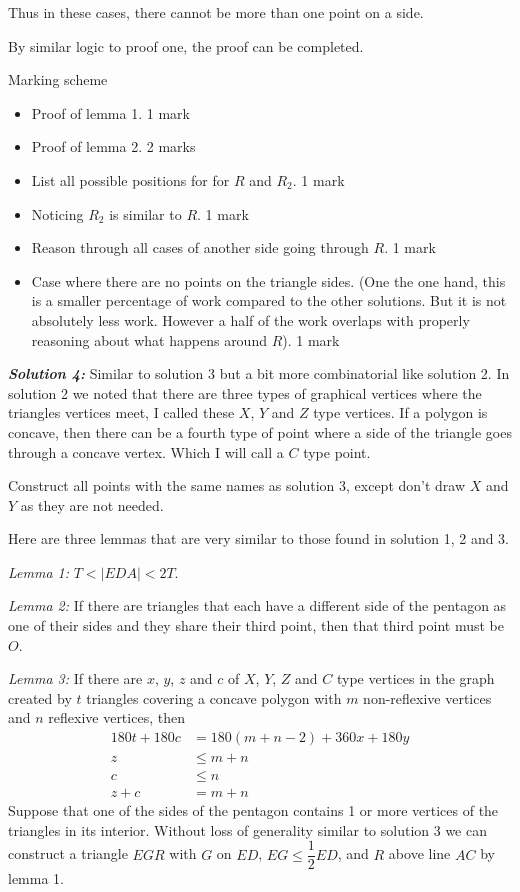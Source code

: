 \documentclass[12pt]{article}
\newcommand{\solnum}[1]{\textbf{\textit{Solution #1: }}}
\begin{document}
\begin{enumerate}[topsep=\bigskipamount,itemsep=\bigskipamount,leftmargin=0pt]
Thus in these cases, there cannot be more than one point on a side.

By similar logic to proof one, the proof can be completed.

Marking scheme
\begin{itemize}
\item Proof of lemma 1. 1 mark
\item Proof of lemma 2. 2 marks
\item List all possible positions for for $R$ and $R_2$. 1 mark
\item Noticing $R_2$ is similar to $R$. 1 mark
\item Reason through all cases of another side going through $R$. 1 mark
\item Case where there are no points on the triangle sides. 
(One the one hand, this is a smaller percentage of work compared to the other solutions.
But it is not absolutely less work. 
However a half of the work overlaps with properly reasoning about what happens around $R$).
1 mark
\end{itemize}

\solnum{4}
Similar to solution 3 but a bit more combinatorial like solution 2.
In solution 2 we noted that there are three types of graphical vertices where the triangles vertices meet,
I called these $X$, $Y$ and $Z$ type vertices.
If a polygon is concave, then there can be a fourth type of point 
where a side of the triangle goes through a concave vertex.
Which I will call a $C$ type point.

Construct all points with the same names as solution 3, except don't draw $X$ and $Y$ as they are not needed.

Here are three lemmas that are very similar to those found in solution 1, 2 and 3.

\textit{Lemma 1:}
$T < |EDA| < 2T$.

\textit{Lemma 2:}
If there are triangles that each have a different side of the pentagon as one of their sides
and they share their third point,
then that third point must be $O$.

\textit{Lemma 3:}
If there are $x$, $y$, $z$ and $c$ 
of $X$, $Y$, $Z$ and $C$ type vertices
in the graph created by $t$ triangles 
covering a concave polygon with $m$ non-reflexive vertices and $n$ reflexive vertices, then
\begin{align*}
    180t + 180c &= 180(m+n-2) + 360x + 180y \\
    z &\leq m+n \\
    c &\leq n \\
    z+c &= m+n
\end{align*}
Suppose that one of the sides of the pentagon contains 1 or more vertices of the triangles in its interior.
Without loss of generality similar to solution 3 we can construct a triangle $EGR$
with $G$ on $ED$, $EG \leq \dfrac{1}{2} ED$,
and $R$ above line $AC$ by lemma 1.


\end{enumerate}
\end{document}

